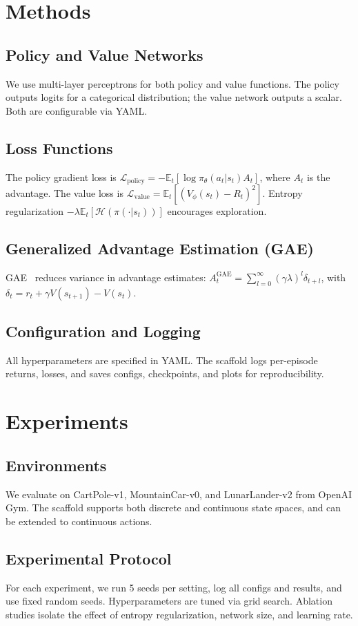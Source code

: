 \documentclass[conference]{IEEEtran}
\begin{document}
\section{Methods}
\subsection{Policy and Value Networks}
We use multi-layer perceptrons for both policy and value functions. The policy outputs logits for a categorical distribution; the value network outputs a scalar. Both are configurable via YAML.

\subsection{Loss Functions}
The policy gradient loss is $\mathcal{L}_\text{policy} = -\mathbb{E}_t[\log \pi_\theta(a_t|s_t) A_t]$, where $A_t$ is the advantage. The value loss is $\mathcal{L}_\text{value} = \mathbb{E}_t[(V_\phi(s_t) - R_t)^2]$. Entropy regularization $-\lambda \mathbb{E}_t[\mathcal{H}(\pi(\cdot|s_t))]$ encourages exploration.

\subsection{Generalized Advantage Estimation (GAE)}
GAE~\cite{schulman2015high} reduces variance in advantage estimates:
$A_t^{\text{GAE}} = \sum_{l=0}^{\infty} (\gamma \lambda)^l \delta_{t+l}$, with $\delta_t = r_t + \gamma V(s_{t+1}) - V(s_t)$.

\subsection{Configuration and Logging}
All hyperparameters are specified in YAML. The scaffold logs per-episode returns, losses, and saves configs, checkpoints, and plots for reproducibility.

\section{Experiments}
\subsection{Environments}
We evaluate on CartPole-v1, MountainCar-v0, and LunarLander-v2 from OpenAI Gym. The scaffold supports both discrete and continuous state spaces, and can be extended to continuous actions.

\subsection{Experimental Protocol}
For each experiment, we run 5 seeds per setting, log all configs and results, and use fixed random seeds. Hyperparameters are tuned via grid search. Ablation studies isolate the effect of entropy regularization, network size, and learning rate.
\end{document}
